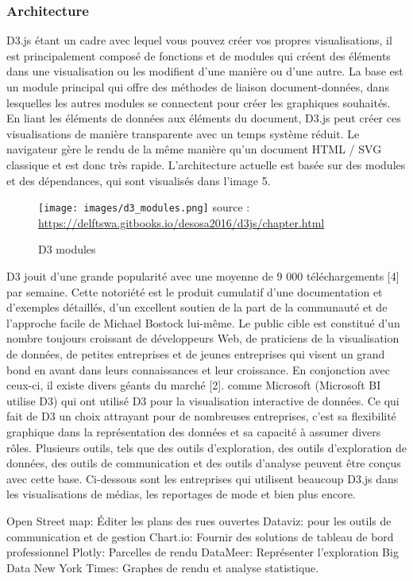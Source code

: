 \documentclass[french, a4paper, 12pt]{report}
\begin{document}
\subsubsection{Architecture}
D3.js étant un cadre avec lequel vous pouvez créer vos propres visualisations, il est principalement composé de fonctions et de modules qui créent des éléments dans une visualisation ou les modifient d’une manière ou d’une autre. La base est un module principal qui offre des méthodes de liaison document-données, dans lesquelles les autres modules se connectent pour créer les graphiques souhaités. En liant les éléments de données aux éléments du document, D3.js peut créer ces visualisations de manière transparente avec un temps système réduit. Le navigateur gère le rendu de la même manière qu’un document HTML / SVG classique et est donc très rapide.
L'architecture actuelle est basée sur des modules et des dépendances, qui sont visualisés dans l'image 5.
\begin{figure}[!htp]
    \centering
    \texttt{[image: images/d3\_modules.png]}
    \scriptsize{source : \url{https://delftswa.gitbooks.io/desosa2016/d3js/chapter.html}}
    \caption{D3 modules}
    \label{fig:2.16}
\end{figure}
D3 jouit d'une grande popularité avec une moyenne de 9 000 téléchargements [4] par semaine. Cette notoriété est le produit cumulatif d’une documentation et d’exemples détaillés, d’un excellent soutien de la part de la communauté et de l’approche facile de Michael Bostock lui-même. Le public cible est constitué d'un nombre toujours croissant de développeurs Web, de praticiens de la visualisation de données, de petites entreprises et de jeunes entreprises qui visent un grand bond en avant dans leurs connaissances et leur croissance. En conjonction avec ceux-ci, il existe divers géants du marché [2]. comme Microsoft (Microsoft BI utilise D3) qui ont utilisé D3 pour la visualisation interactive de données. Ce qui fait de D3 un choix attrayant pour de nombreuses entreprises, c’est sa flexibilité graphique dans la représentation des données et sa capacité à assumer divers rôles. Plusieurs outils, tels que des outils d'exploration, des outils d'exploration de données, des outils de communication et des outils d'analyse peuvent être conçus avec cette base. Ci-dessous sont les entreprises qui utilisent beaucoup D3.js dans les visualisations de médias, les reportages de mode et bien plus encore.

Open Street map: Éditer les plans des rues ouvertes
Dataviz: pour les outils de communication et de gestion
Chart.io: Fournir des solutions de tableau de bord professionnel
Plotly: Parcelles de rendu
DataMeer: Représenter l'exploration Big Data
New York Times: Graphes de rendu et analyse statistique.
\end{document}
